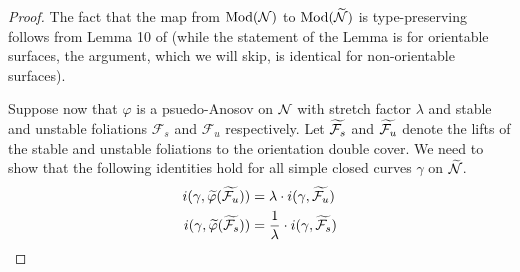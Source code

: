 \begin{proof}
  The fact that the map from $\operatorname{Mod}(\mathcal{N})$ to $\operatorname{Mod}(\widetilde{\mathcal{N}})$ is type-preserving follows from Lemma 10 of \cite{aramayona2009injections} (while the statement of the Lemma is for orientable surfaces, the argument, which we will skip, is identical for non-orientable surfaces).

  Suppose now that $\varphi$ is a psuedo-Anosov on $\mathcal{N}$ with stretch factor $\lambda$ and stable and unstable foliations $\mathcal{F}_s$ and $\mathcal{F}_u$ respectively.
  Let $\widetilde{\mathcal{F}_s}$ and $\widetilde{\mathcal{F}_u}$ denote the lifts of the stable and unstable foliations to the orientation double cover.
  We need to show that the following identities hold for all simple closed curves $\gamma$ on $\widetilde{\mathcal{N}}$.
  \begin{align}
      \label{eq:unstable-foliation}
      i(\gamma, \widetilde{\varphi}(\widetilde{\mathcal{F}_u})) &= \lambda \cdot i(\gamma, \widetilde{\mathcal{F}_u}) \\
      \label{eq:stable-foliation}
      i(\gamma, \widetilde{\varphi}(\widetilde{\mathcal{F}_s})) &= \frac{1}{\lambda} \cdot i(\gamma, \widetilde{\mathcal{F}_s})
  \end{align}
  

\end{proof}

